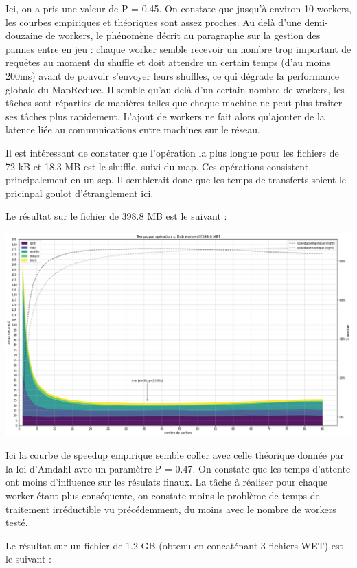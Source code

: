 \documentclass[11pt,a4paper]{article}
\begin{document}
Ici, on a pris une valeur de P = 0.45. On constate que jusqu'à environ 10 workers, les courbes empiriques et théoriques sont assez proches. Au delà d'une demi-douzaine de workers, le phénomène décrit au paragraphe sur la gestion des pannes entre en jeu : chaque worker semble recevoir un nombre trop important de requêtes au moment du shuffle et doit attendre un certain temps (d'au moins 200ms) avant de pouvoir s'envoyer leurs shuffles, ce qui dégrade la performance globale du MapReduce. Il semble qu'au delà d'un certain nombre de workers, les tâches sont réparties de manières telles que chaque machine ne peut plus traiter ses tâches plus rapidement. L'ajout de workers ne fait alors qu'ajouter de la latence liée au communications entre machines sur le réseau.

Il est intéressant de constater que l'opération la plus longue pour les fichiers de 72 kB et 18.3 MB est le shuffle, suivi du map. Ces opérations consistent principalement en un scp. Il semblerait donc que les temps de transferts soient le pricinpal goulot d'étranglement ici. 

Le résultat sur le fichier de 398.8 MB est le suivant :

\includegraphics[width=\columnwidth]{graph2.png}

Ici la courbe de speedup empirique semble coller avec celle théorique donnée par la loi d'Amdahl avec un paramètre P = 0.47. On constate que les temps d'attente ont moins d'influence sur les résulats finaux. La tâche à réaliser pour chaque worker étant plus conséquente, on constate moins le problème de temps de traitement irréductible vu précédemment, du moins avec le nombre de workers testé.

Le résultat sur un fichier de 1.2 GB (obtenu en concaténant 3 fichiers WET) est le suivant :
\end{document}
